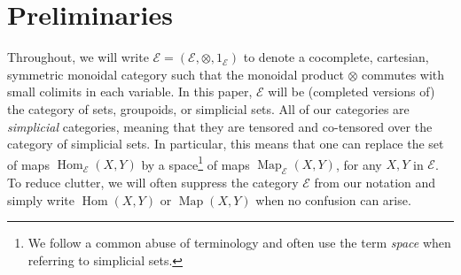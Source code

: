 \documentclass{amsart}
\newcommand{\bE}{\mathscr{E}}
\newcommand{\bS}{\mathbf{S}}
\newcommand{\cs}{\mathrm{B}}
\newcommand{\Hom}{\operatorname{Hom}}
\newcommand{\Map}{\operatorname{Map}}
\newcommand{\GT}{\widehat{\mathsf{GT}}}
\newcommand{\NS}{\widehat{\mathsf{\Gamma}}}
\newtheorem*{thm*}{Theorem}
\theoremstyle{definition}
\numberwithin{equation}{section}
\begin{document}

\tableofcontents
\section{Preliminaries}
Throughout, we will write $\bE=(\bE, \otimes, 1_{\bE})$ to denote a cocomplete, cartesian, symmetric monoidal category such that the monoidal product $\otimes$ commutes with small colimits in each variable. In this paper, $\bE$ will be (completed versions of) the category of sets, groupoids, or simplicial sets. All of our categories are \emph{simplicial} categories, meaning that they are tensored and co-tensored over the category of simplicial sets. In particular, this means that one can replace the set of maps $\Hom_{\bE}(X,Y)$ by a space\footnote{We follow a common abuse of terminology and often use the term \emph{space} when referring to simplicial sets.} of maps $\Map_{\bE}(X,Y)$, for any $X,Y$ in $\bE$. To reduce clutter, we will often suppress the category $\bE$ from our notation and simply write $\Hom(X,Y)$ or $\Map(X,Y)$ when no confusion can arise. 
\end{document}
